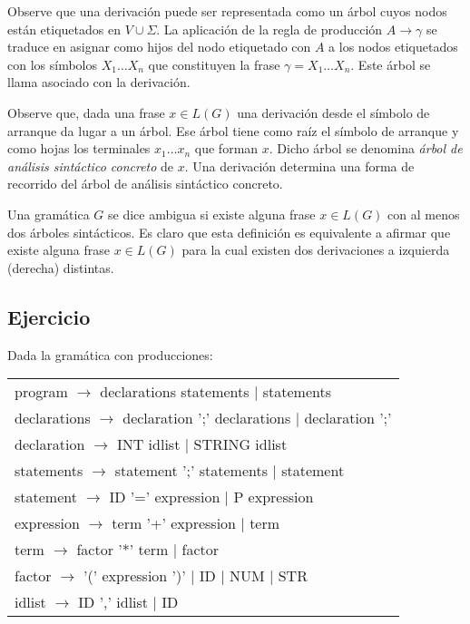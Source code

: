 \begin{definition}
Observe que una derivación puede ser representada como un árbol cuyos nodos
están etiquetados en $V \cup \Sigma$. La aplicación de la regla de 
producción $A \rightarrow \gamma$ se traduce en asignar como hijos del nodo etiquetado con $A$
a los nodos etiquetados con los símbolos $X_1 \ldots X_n$ que constituyen
la frase $\gamma = X_1 \ldots X_n$.  
Este árbol se llama  asociado 
con la derivación.
\end{definition}

\begin{definition}
\label{definition:arbolconcreto}
Observe que, dada una frase $x \in L(G)$ una derivación desde el
símbolo de arranque da lugar a  un árbol. Ese árbol tiene como raíz el 
símbolo de arranque y como hojas los terminales 
$x_1 \ldots x_n$ que forman $x$. Dicho árbol se denomina \emph{árbol
de análisis sintáctico concreto} de $x$. Una derivación determina
una forma de recorrido del árbol de análisis sintáctico concreto.
\end{definition}

\begin{definition}
Una gramática $G$ se dice ambigua si existe alguna frase $x \in L(G)$
con al menos dos árboles sintácticos. 
Es claro que esta definición es equivalente a afirmar que existe 
alguna frase $x \in L(G)$ para la cual existen dos derivaciones a 
izquierda (derecha) distintas.
\end{definition}

\subsection{Ejercicio}
\label{ejercicio:tutugrammar}
Dada la gramática con producciones:

\vspace{0.5cm}
\begin{tabular}{l}
program      $\rightarrow$  declarations  statements         $|$ statements\\
declarations $\rightarrow$ declaration  ';'  declarations    $|$ declaration ';'\\
declaration  $\rightarrow$ INT  idlist                       $|$ STRING   idlist\\
statements   $\rightarrow$ statement  ';'  statements        $|$ statement\\
statement    $\rightarrow$ ID '=' expression                 $|$ P  expression\\
expression   $\rightarrow$ term '+' expression               $|$ term\\
term         $\rightarrow$ factor '*' term                   $|$ factor\\
factor       $\rightarrow$ '(' expression ')' $|$ ID $|$ NUM $|$ STR\\
idlist       $\rightarrow$ ID ',' idlist $|$ ID
\end{tabular}
\vspace{0.25cm}

